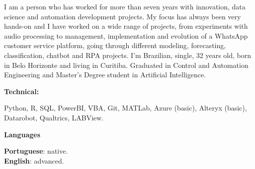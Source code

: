 \documentclass[9pt]{developercv} %
\begin{document}
	\begin{minipage}[t]{0.46\textwidth}
		\vspace{-6pt}
		
		I am a person who has worked for more than seven years with innovation, data science and automation development projects. My focus has always been very hands-on and I have worked on a wide range of projects, from experiments with audio processing to management, implementation and evolution of a WhatsApp customer service platform, going through different modeling, forecasting, classification, chatbot and RPA projects. I'm Brazilian, single, 32 years old, born in Belo Horizonte and living in Curitiba. Graduated in Control and Automation Engineering and Master's Degree student in Artificial Intelligence.
		
	\end{minipage}
	\hfill %
	\begin{minipage}[t]{0.465\textwidth}
		\vspace{-6pt}
		
		\begin{minipage}[t]{0.2\textwidth}
			\textbf{Technical:}
		\end{minipage}
		\hfill
		\begin{minipage}[t]{0.73\textwidth}
			Python, R, SQL, PowerBI, VBA, Git, MATLab, Azure (basic), Alteryx (basic), Datarobot, Qualtrics, LABView.  
		\end{minipage}
		\vspace{4mm}
		
		\begin{minipage}[t]{0.2\textwidth}
			\textbf{Languages}
		\end{minipage}
		\hfill
		\begin{minipage}[t]{0.73\textwidth}
			\textbf{Portuguese}: native.\\
			\textbf{English}: advanced.
		\end{minipage}
		
	\end{minipage}
	\vspace{-10 pt}
\end{document}
